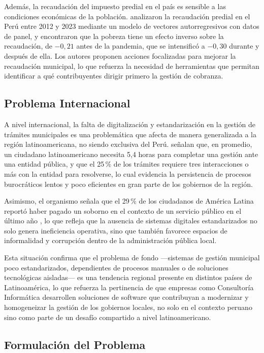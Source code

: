 \documentclass[12pt,a4paper]{report}
\begin{document}
Además, la recaudación del impuesto predial en el país es sensible a las condiciones económicas de la población. \textcite{cayatopa2026} analizaron la recaudación predial en el Perú entre 2012 y 2023 mediante un modelo de vectores autorregresivos con datos de panel, y encontraron que la pobreza tiene un efecto inverso sobre la recaudación, de $-0{,}21$ antes de la pandemia, que se intensificó a $-0{,}30$ durante y después de ella. Los autores proponen acciones focalizadas para mejorar la recaudación municipal, lo que refuerza la necesidad de herramientas que permitan identificar a qué contribuyentes dirigir primero la gestión de cobranza.

\subsection{Problema Internacional}

A nivel internacional, la falta de digitalización y estandarización en la gestión de trámites municipales es una problemática que afecta de manera generalizada a la región latinoamericana, no siendo exclusiva del Perú. \textcite{bid2018} señalan que, en promedio, un ciudadano latinoamericano necesita 5,4 horas para completar una gestión ante una entidad pública, y que el 25\,\% de los trámites requiere tres interacciones o más con la entidad para resolverse, lo cual evidencia la persistencia de procesos burocráticos lentos y poco eficientes en gran parte de los gobiernos de la región.

Asimismo, el organismo señala que el 29\,\% de los ciudadanos de América Latina reportó haber pagado un soborno en el contexto de un servicio público en el último año \parencite{bid2018}, lo que refleja que la ausencia de sistemas digitales estandarizados no solo genera ineficiencia operativa, sino que también favorece espacios de informalidad y corrupción dentro de la administración pública local.

Esta situación confirma que el problema de fondo ---sistemas de gestión municipal poco estandarizados, dependientes de procesos manuales o de soluciones tecnológicas aisladas--- es una tendencia regional presente en distintos países de Latinoamérica, lo que refuerza la pertinencia de que empresas como Consultoría Informática desarrollen soluciones de software que contribuyan a modernizar y homogeneizar la gestión de los gobiernos locales, no solo en el contexto peruano sino como parte de un desafío compartido a nivel latinoamericano.

\subsection{Formulación del Problema}
\end{document}
